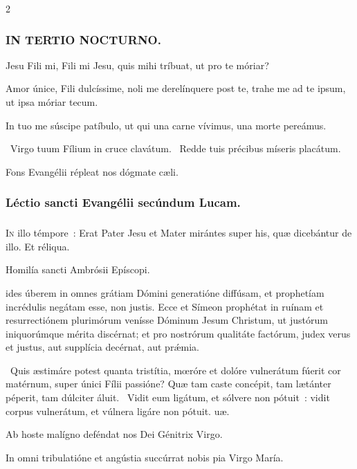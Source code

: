 \documentclass[9pt,twoside]{extarticle}
\begin{document}
\begin{multicols}{2}
\subsubsection*{\center \textsc{IN TERTIO NOCTURNO.}}
\begin{tightlist}{}
\item {} Jesu Fili mi, Fili mi Jesu, quis mihi tríbuat, ut pro te móriar?
\item {} Amor únice, Fili dulcíssime, noli me derelínquere post te, trahe me ad te ipsum, ut ipsa móriar tecum.
\item {} In tuo me súscipe patíbulo, ut qui una carne vívimus, una morte pereámus.
\item {}~Virgo tuum Fílium in cruce clavátum. ~Redde tuis précibus míseris placátum. 
\item {\small {} Fons Evangélii répleat nos dógmate cæli.}
\end{tightlist}

\subsubsection*{\center Léctio sancti Evangélii secúndum Lucam.}
\subsubsection*{\center {}}
\lettrine{I}n illo témpore~: Erat Pater Jesu et Mater mirántes super his, quæ dicebántur de illo. Et réliqua.

\begin{center}Homilía sancti Ambrósii Epíscopi.\\
\end{center}
ides úberem in omnes grátiam Dómini generatióne diffúsam, et prophetíam incrédulis negátam esse, non justis. Ecce et Símeon prophétat in ruínam et resurrectiónem plurimórum venísse Dóminum Jesum Christum, ut justórum iniquorúmque mérita discérnat; et pro nostrórum qualitáte factórum, judex verus et justus, aut supplícia decérnat, aut prǽmia.

\begin{tightlist}{}
\item {}~Quis æstimáre potest quanta tristítia, mœróre et dolóre vulnerátum fúerit cor matérnum, super únici Fílii passióne? \textred{*} Quæ tam caste concépit, tam lætánter péperit, tam dúlciter áluit. ~Vidit eum ligátum, et sólvere non pótuit~: vidit corpus vulnerátum, et vúlnera ligáre non pótuit. uæ.
\item {\small {} Ab hoste malígno deféndat nos Dei Génitrix Virgo.}
\item {}
\item {\small {} In omni tribulatióne et angústia succúrrat nobis pia Virgo María.}
\end{tightlist}


\end{multicols}
\end{document}
